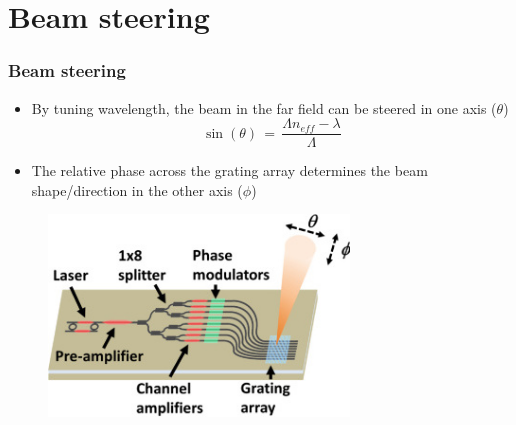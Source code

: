 \documentclass{beamer}
\begin{document}
\section{Beam steering} 
\begin{frame}
\frametitle{Beam steering}
\begin{itemize}
\item By tuning wavelength, the beam in the far field can be steered in one axis ($\theta$)
    \begin{equation}
    \sin(\theta)\, =\, \frac{\Lambda n_{eff} - \lambda}{\Lambda }
    \end{equation}
\item The relative phase across the grating array determines the beam shape/direction in the other axis ($\phi$)
\end{itemize}

\begin{figure}[htbp]
    \begin{center}
    \includegraphics[width=8cm]{graphs/pic3}
    \label{default}
    \end{center}
    \end{figure}
 \end{frame}
%
\end{document}
